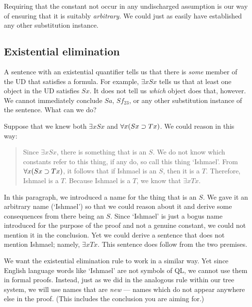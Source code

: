 \begin{ndproof}
	\open
	\close
\end{ndproof}

Requiring that the constant not occur in any undischarged assumption is our way of ensuring that it is suitably \emph{arbitrary}. We could just as easily have established any other substitution instance.

\subsection{Existential elimination}
A sentence with an existential quantifier tells us that there is \emph{some} member of the UD that satisfies a formula. For example, $\exists x Sx$ tells us that at least one object in the UD satisfies $Sx$. It does not tell us \emph{which} object does that, however. We cannot immediately conclude $Sa$, $Sf_{23}$, or any other substitution instance of the sentence. What can we do?

Suppose that we knew both $\exists x Sx$ and $\forall x(Sx \supset Tx)$. We could reason in this way:
\begin{quote}
Since $\exists x Sx$, there is something that is an $S$. We do not know which constants refer to this thing, if any do, so call this thing `Ishmael'. From $\forall x(Sx \supset Tx)$, it follows that if Ishmael is an $S$, then it is a $T$. Therefore, Ishmael is a $T$.  Because Ishmael is a $T$, we know that $\exists x Tx$.
\end{quote}
In this paragraph, we introduced a name for the thing that is an $S$. We gave it an arbitrary name (`Ishmael') so that we could reason about it and derive some consequences from there being an $S$. Since `Ishmael' is just a bogus name introduced for the purpose of the proof and not a genuine constant, we could not mention it in the conclusion. Yet we could derive a sentence that does not mention Ishmael; namely, $\exists x Tx$. This sentence does follow from the two premises.

We want the existential elimination rule to work in a similar way. Yet since English language words like `Ishmael' are not symbols of QL, we cannot use them in formal proofs. Instead, just as we did in the analogous rule within our tree system, we will use names that are \emph{new} --- names which do not appear anywhere else in the proof. (This includes the conclusion you are aiming for.)

